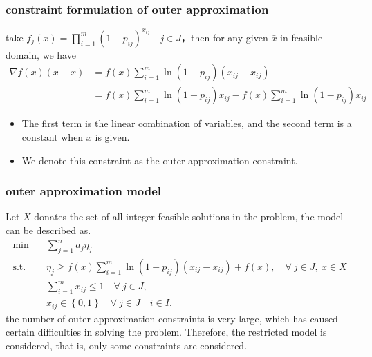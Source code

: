 \documentclass[CJK,10pt]{beamer}
\begin{document}
\begin{frame}
    \frametitle{constraint formulation of outer approximation}
    take $f_j(x) =  \prod_{i=1}^m (1 -  p_{ij})^{x_{ij}}\quad j \in J$，then for any given  $\bar{x}$ in feasible domain, we have 
    \begin{align*}
        \nabla f(\bar{x})(x - \bar{x}) & = f(\bar{x})\sum_{i = 1}^m \ln(1-p_{ij})(x_{ij} - \bar{x_{ij}})\\
        &= f(\bar{x})\sum_{i = 1}^m \ln(1-p_{ij})x_{ij} - f(\bar{x})\sum_{i = 1}^m \ln(1-p_{ij})\bar{x_{ij}}
    \end{align*}
    \begin{itemize}
        \item The first term is the linear combination of variables, and the second term is a constant when $\bar{x}$ is given.
        \item We denote this constraint as the outer approximation constraint.
    \end{itemize}
    

    
\end{frame}

\begin{frame}
    \frametitle{outer approximation model}
    
    {\scriptsize
    Let $X$ donates the set of all integer feasible solutions in the problem, the model can be described as.
    \begin{align*} \tag{OA}
        \min\quad & \sum_{j=1}^n a_j \eta_j \\ 
        \mathrm{s. t.}\quad & \eta_j \geq f(\bar{x})\sum_{i = 1}^m \ln(1-p_{ij})(x_{ij} - \bar{x_{ij}}) + f(\bar{x}), \quad \forall ~ j \in J,\ \bar{x} \in X \\ 
        &\sum_{i=1}^m x_{ij} \leq 1\quad \forall ~ j \in J,\\
        & x_{ij} \in \left\{ 0,1 \right\} \quad \forall ~ j\in J\quad i \in I.
    \end{align*}
    the number of outer approximation constraints is very large, which has caused certain difficulties in solving the problem. Therefore, the restricted model is considered, that is, only some constraints are considered.
    }
   
\end{frame}
\end{document}
